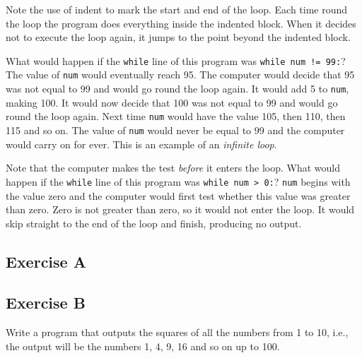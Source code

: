 Note the use of %
indent to mark the start and end of the loop.
Each time round the loop the program does everything inside
the indented block.
When it decides not to execute the loop again, it jumps to the point
beyond the indented block.

What would happen if the \texttt{while} line of this program was
\texttt{while num != 99:}?
The value of \texttt{num} would eventually reach 95.  The computer would
decide that 95 was not equal to 99 and would go round the loop again.
It would add 5 to \texttt{num}, making 100.
It would now decide that 100 was not equal to 99 and would go round the
loop again.  Next time \texttt{num} would have the value 105, then 110,
then 115 and so on.  The value of \texttt{num} would never be equal to 99
and the computer would carry on for ever.  This is an example of
an \emph{infinite loop}.

Note that the computer makes the test \emph{before} it enters the loop.
What would happen if the \texttt{while} line of this program was
\texttt{while num > 0:}?
\texttt{num} begins with the value zero and the computer would first
test whether this value was greater than zero.  Zero is not greater than
zero, so it would not enter the loop.  It would skip straight to the end
of the loop and finish, producing no output.


\subsection*{Exercise A}



\subsection*{Exercise B}

Write a program that outputs the squares of all the numbers from 1 to
10, i.e., the output will be the numbers 1, 4, 9, 16 and so on up to 100.

